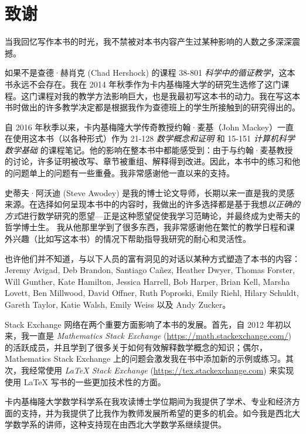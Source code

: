 \chapter*{致谢}

当我回忆写作本书的时光，我不禁被对本书内容产生过某种影响的人数之多深深震撼。

如果不是查德·赫肖克 (Chad Hershock) 的课程 38-801 \textit{科学中的循证教学}，这本书永远不会存在。我在 2014 年秋季作为卡内基梅隆大学的研究生选修了这门课程。这门课程对我的教学方法影响巨大，也是我最初写这本书的动力。我在写这本书时做出的许多教学决定都是根据我作为查德班上的学生所接触到的研究得出的。

自 2016 年秋季以来，卡内基梅隆大学传奇教授约翰·麦基（John Mackey）一直在使用这本书（以各种形式）作为 21-128 \textit{数学概念和证明} 和 15-151 \textit{计算机科学数学基础} 的课程笔记。他的影响在整本书中都能感受到：由于与约翰·麦基教授的讨论，许多证明被改写、章节被重组、解释得到改进。因此，本书中的练习和他的问题单上的问题有一些重叠。我非常感谢他一直以来的支持。

史蒂夫·阿沃迪 (Steve Awodey) 是我的博士论文导师，长期以来一直是我的灵感来源。在选择如何呈现本书中的内容时，我做出的许多选择都是基于我想\textit{以正确的方式}进行数学研究的愿望---正是这种愿望促使我学习范畴论，并最终成为史蒂夫的哲学博士生。 我从他那里学到了很多东西，我非常感谢他在繁忙的教学日程和课外兴趣（比如写这本书）的情况下帮助指导我研究的耐心和灵活性。

也许他们并不知道，与以下人员的富有洞见的对话以某种方式塑造了本书的内容：Jeremy Avigad, Deb Brandon, Santiago Ca\~{n}ez, Heather Dwyer, Thomas Forster, Will Gunther, Kate Hamilton, Jessica Harrell, Bob Harper, Brian Kell, Marsha Lovett, Ben Millwood, David Offner, Ruth Poproski, Emily Riehl, Hilary Schuldt, Gareth Taylor, Katie Walsh, Emily Weiss 以及 Andy Zucker。

Stack Exchange 网络在两个重要方面影响了本书的发展。首先，自 2012 年初以来，我一直是 \textit{Mathematics Stack Exchange} (\url{https://math.stackexchange.com/}) 的活跃成员，并且学到了很多关于如何有效解释数学概念的知识；偶尔，Mathematics Stack Exchange 上的问题会激发我在书中添加新的示例或练习。其次，我经常使用 \textit{\LaTeX{} Stack Exchange} (\url{https://tex.stackexchange.com}) 来实现使用 \LaTeX{} 写书的一些更加技术性的方面。

卡内基梅隆大学数学科学系在我攻读博士学位期间为我提供了学术、专业和经济方面的支持，并为我提供了比我作为教师发展所希望的更多的机会。如今我是西北大学数学系的讲师，这种支持现在由西北大学数学系继续提供。

